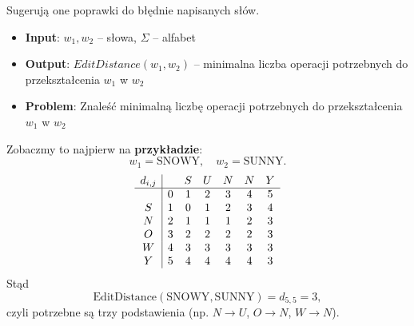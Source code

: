 \documentclass{article}
\begin{document}
    Sugerują one poprawki do błędnie napisanych słów. \par
    \begin{itemize}
        \item \textbf{Input}: $w_1, w_2$ -- słowa, $\Sigma$ -- alfabet
        \item \textbf{Output}: $EditDistance(w_1, w_2)$ -- minimalna liczba operacji potrzebnych do przekształcenia $w_1$ w $w_2$
        \item \textbf{Problem}: Znaleść minimalną liczbę operacji potrzebnych do przekształcenia $w_1$ w $w_2$
    \end{itemize}
    Zobaczmy to najpierw na \textbf{przykładzie}:
    \[
    w_1=\text{SNOWY},\quad w_2=\text{SUNNY}.
    \]
    \[
    \begin{array}{c|cccccc}
    d_{i,j} &   & S & U & N & N & Y \\\hline
            & 0 & 1 & 2 & 3 & 4 & 5 \\
    S       & 1 & 0 & 1 & 2 & 3 & 4 \\
    N       & 2 & 1 & 1 & 1 & 2 & 3 \\
    O       & 3 & 2 & 2 & 2 & 2 & 3 \\
    W       & 4 & 3 & 3 & 3 & 3 & 3 \\
    Y       & 5 & 4 & 4 & 4 & 4 & 3 \\
    \end{array}
    \]
    Stąd
    \[
    \mathrm{EditDistance}(\text{SNOWY},\text{SUNNY}) = d_{5,5} = 3,
    \]
    czyli potrzebne są trzy podstawienia (np. \(N\to U\), \(O\to N\), \(W\to N\)).
    
\end{document}
